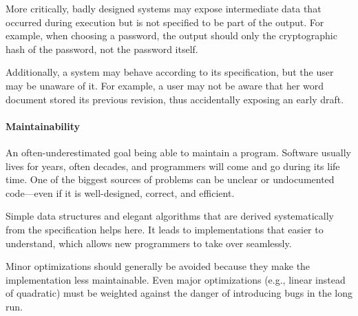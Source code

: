 More critically, badly designed systems may expose intermediate data that occurred during execution but is not specified to be part of the output.
For example, when choosing a password, the output should only the cryptographic hash of the password, not the password itself.

Additionally, a system may behave according to its specification, but the user may be unaware of it.
For example, a user may not be aware that her word document stored its previous revision, thus accidentally exposing an early draft.

\paragraph{Maintainability}
An often-underestimated goal being able to maintain a program.
Software usually lives for years, often decades, and programmers will come and go during its life time.
One of the biggest sources of problems can be unclear or undocumented code---even if it is well-designed, correct, and efficient.

Simple data structures and elegant algorithms that are derived systematically from the specification helps here.
It leads to implementations that easier to understand, which allows new programmers to take over seamlessly.

Minor optimizations should generally be avoided because they make the implementation less maintainable.
Even major optimizations (e.g., linear instead of quadratic) must be weighted against the danger of introducing bugs in the long run.